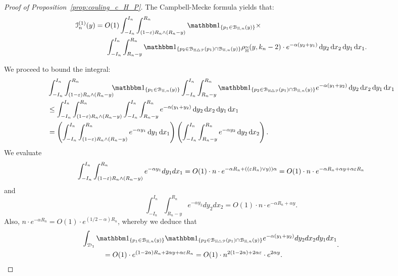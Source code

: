 \begin{proof}[Proof of Proposition~\ref{prop:couling_c_H_P}]
The Campbell-Mecke formula yields that: 
\begin{equation*}
\begin{split} 
\mathcal{I}_n^{(1)}(y) 
&=O(1) \int_{-I_n}^{I_n} \int_{(1-\eps) R_n \wedge (R_n-y)}^{R_n} \ind{p_1 \in \BallHyp{y}} \times\\
& \hspace{15pt}\int_{-I_n}^{I_n} \int_{R_n - y}^{R_n} 
\ind{p_2 \in \BallSym{p_1} \cap \BallHyp{y}}
  \rho_{\HP}(y,k_n-2) \cdot
e^{-\alpha( y_2 + y_1)} \dd y_2 \dd x_2 \dd y_1 \dd x_1.
\end{split}
\end{equation*}

We proceed to bound the integral: 
\begin{align*}
	&\int_{-I_n}^{I_n} \int_{(1-\eps) R_n \wedge (R_n-y)}^{R_n} \hspace{-5pt} \ind{p_1 \in \BallHyp{y}}
		\int_{-I_n}^{I_n} \int_{R_n - y}^{R_n } \ind{p_2 \in \BallSym{p_1} \cap \BallHyp{y}} 
		e^{-\alpha(y_1 + y_2)} \dd y_2 \dd x_2 \dd y_1 \dd x_1 \\
	&\leq \int_{-I_n}^{I_n} \int_{(1-\eps) R_n \wedge (R_n-y)}^{R_n} 
		\int_{-I_n}^{I_n} \int_{R_n - y}^{R_n}  e^{-\alpha(y_1 + y_2)} \dd y_2 \dd x_2 \dd y_1 \dd x_1\\
	&= \left( \int_{-I_n}^{I_n} \int_{(1-\eps) R_n \wedge (R_n-y)}^{R_n} e^{- \alpha y_1} \dd y_1 \dd x_1 \right) 
	\left(\int_{-I_n}^{I_n} \int_{R_n - y}^{R_n}  e^{-\alpha y_2} \dd y_2 \dd x_2 \right).
\end{align*}
We evaluate
$$  \int_{-I_n}^{I_n} \int_{(1-\varepsilon) R_n \wedge (R_n-y)}^{R_n} 
e^{- \alpha y_1} dy_1 dx_1= O(1) \cdot n \cdot e^{-\alpha R_n + ((\varepsilon R_n) \vee y))\alpha}
=O(1) \cdot n \cdot e^{-\alpha R_n + \alpha y + \alpha \varepsilon R_n }
$$
and 
$$\int_{-I_n}^{I_n} \int_{R_n - y}^{R_n}  e^{-\alpha y_2} dy_2 dx_2 
=O(1) \cdot n \cdot e^{-\alpha R_n +\alpha y}.
$$
Also, $n \cdot e^{-\alpha R_n} = O(1) \cdot e^{(1/2 -\alpha) R_n}$, whereby we deduce that 
\begin{equation*}
\begin{split}
&\hspace{-30pt}\int_{\dom{1}} \ind{p_1 \in \BallHyp{y}} \ind{p_2 \in \BallSym{p_1} \cap \BallHyp{y}} 
 e^{-\alpha(y_1 + y_2)} dy_2 dx_2 dy_1 dx_1 \\
&=O(1) \cdot e^{(1-2\alpha)R_n + 2\alpha y + \alpha \eps R_n} =O(1) \cdot n^{2(1-2\alpha) + 2\alpha \eps} \cdot e^{2\alpha y}.
\end{split}.
\end{equation*}


\end{proof}
